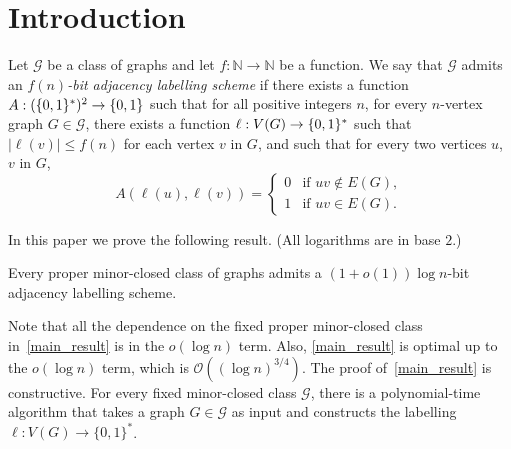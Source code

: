 \documentclass{patmorin}
\renewcommand{\leq}{\leqslant}
\newcommand{\david}[1]{{\color{orange} DW: #1}}
\newcommand{\pat}[1]{\textcolor{Magenta}{PaMo: #1}}
\newcommand{\defin}[1]{\emph{\textcolor{brightmaroon}{#1}}}
\newcommand{\NN}{\mathbb{N}}
\newcommand{\calG}{\mathcal{G}}
\newcommand{\Oh}{\mathcal{O}}
\DeclarePairedDelimiter{\set}{\{}{\}}
\begin{document}
  \section{Introduction}
Let $\calG$ be a class of graphs and let $f:\NN\to\NN$ be a function.
We say that $\calG$ admits an \defin{$f(n)$-bit adjacency labelling scheme} if there exists a function $A:(\set{0,1}^*)^2\to\set{0,1}$ such that for all positive integers $n$, for every $n$-vertex graph $G\in\calG$, there exists a function $\ell: V(G)\to\set{0,1}^*$ such that
$|\ell(v)|\leq f(n)$ for each vertex $v$ in $G$, and such that
for every two vertices $u$, $v$ in $G$,
\[
A(\ell(u),\ell(v))=\begin{cases}
0&\textrm{if $uv\notin E(G)$},\\
1&\textrm{if $uv\in E(G)$}.
\end{cases}
\]

In this paper we prove the following result. (All logarithms are in base $2$.)

\begin{thm}
\label{main_result}
Every proper minor-closed class of graphs admits
a $(1+o(1))\log n$-bit adjacency labelling scheme.
\end{thm}


Note that all the dependence on the fixed proper minor-closed class in~\cref{main_result} is in the $o(\log n)$ term. Also, \cref{main_result} is optimal up to the $o(\log n)$ term,
which is $\Oh\left((\log n)^{3/4}\right)$.
The proof of~\cref{main_result} is constructive. For every fixed minor-closed class $\calG$, there is a polynomial-time algorithm that takes a graph $G\in\calG$ as input and constructs the labelling $\ell:V(G)\to\{0,1\}^*$.

\end{document}
